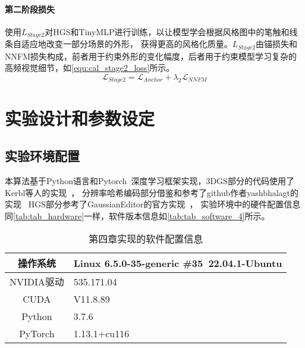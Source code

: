 \paragraph{第二阶段损失}
使用$L_{Stage2}$对HGS和TinyMLP进行训练，以让模型学会根据风格图中的笔触和线条自适应地改变一部分场景的外形，
获得更高的风格化质量。$L_{Stage2}$由锚损失和NNFM损失构成，前者用于约束外形的变化幅度，后者用于约束模型学习复杂的高频视觉细节，如\autoref{equ:cal_stage2_loss}所示。
\begin{equation}
    \label{equ:cal_stage2_loss}
    \mathcal{L}_{Stage2}=\mathcal{L}_{Anchor}+\lambda_2\mathcal{L}_{NNFM}
\end{equation}
\section{实验设计和参数设定}    
\subsection{实验环境配置}
本算法基于Python语言和Pytorch~\cite{paszke2019pytorch}深度学习框架实现，3DGS部分的代码使用了Kerbl等人的实现~\cite{3dgsrepo}，
分辨率哈希编码部分借鉴和参考了github作者yashbhalagt的实现~\cite{ingp-torchrepo}
HGS部分参考了GaussianEditor的官方实现~\cite{gaussianeditorrepo}，
实验环境中的硬件配置信息同\autoref{tab:tab_hardware}一样，软件版本信息如\autoref{tab:tab_software_4}所示。
\begin{table}[htbp]
    \caption{\label{tab:tab_software_4}第四章实现的软件配置信息}
    \begin{tabularx}{\linewidth}{c|X<{\centering}}
        \hline
        操作系统 & Linux 6.5.0-35-generic \#35~22.04.1-Ubuntu \\ \hline
        NVIDIA驱动 & 535.171.04 \\ \hline
        CUDA & V11.8.89 \\ \hline
        Python & 3.7.6 \\ \hline
        PyTorch & 1.13.1+cu116 \\ \hline
    \end{tabularx}
\end{table}

